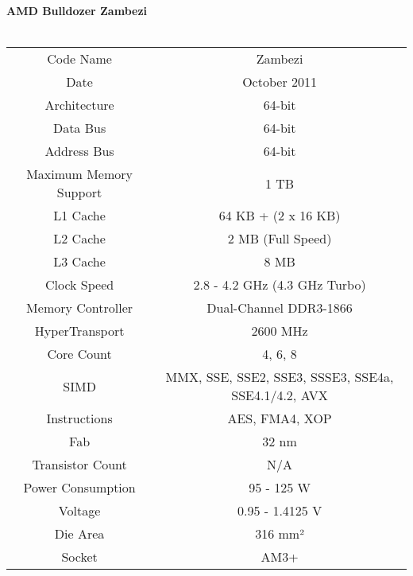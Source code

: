 \documentclass[../computer-history.tex]{subfiles}
\begin{document}
\ \\ \\
\textbf{AMD Bulldozer Zambezi} \\ \\
\begin{tabular}{c|c}
    Code Name & Zambezi \\
    Date & October 2011 \\
    Architecture & 64-bit \\
    Data Bus & 64-bit \\
    Address Bus & 64-bit \\
    Maximum Memory Support & 1 TB \\
    L1 Cache & 64 KB + (2 x 16 KB) \\
    L2 Cache & 2 MB (Full Speed) \\
    L3 Cache & 8 MB \\
    Clock Speed & 2.8 - 4.2 GHz (4.3 GHz Turbo) \\
    Memory Controller & Dual-Channel DDR3-1866 \\
    HyperTransport & 2600 MHz \\
    Core Count & 4, 6, 8 \\
    SIMD & MMX, SSE, SSE2, SSE3, SSSE3, SSE4a, SSE4.1/4.2, AVX \\
    Instructions & AES, FMA4, XOP \\
    Fab & 32 nm \\
    Transistor Count & N/A \\
    Power Consumption & 95 - 125 W \\
    Voltage & 0.95 - 1.4125 V \\
    Die Area & 316 mm² \\
    Socket & AM3+
\end{tabular}
\end{document}
